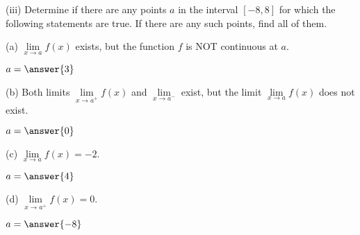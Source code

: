 \documentclass{ximera}
\begin{document}
\begin{exercise}
(iii) Determine if there are any points $a$ in the interval $[-8,8]$ for which the following statements are true. If there are any such points, find all of them.

(a) $\lim\limits_{x\to a} f(x)$ exists, but the function $f$ is NOT continuous at $a$.
\begin{prompt}
\begin{multipleChoice}
\end{multipleChoice}

\begin{exercise}
$a=\answer{3}$
\end{exercise}
\end{prompt}

(b) Both limits $\lim\limits_{x\to a^+} f(x)$ and $\lim\limits_{x\to a^-}$ exist, but the limit $\lim\limits_{x\to a} f(x)$ does not exist.

\begin{prompt}
\begin{multipleChoice}
\end{multipleChoice}

\begin{exercise}
$a=\answer{0}$
\end{exercise}
\end{prompt}

(c) $\lim\limits_{x\to a} f(x)=-2$.

\begin{prompt}
\begin{multipleChoice}
\end{multipleChoice}

\begin{exercise}
$a=\answer{4}$
\end{exercise}
\end{prompt}

(d) $\lim\limits_{x\to a^+} f(x)=0$.
\begin{prompt}
\begin{multipleChoice}
\end{multipleChoice}

\begin{exercise}
$a=\answer{-8}$
\end{exercise}
\end{prompt}


\end{exercise}
\end{document}
